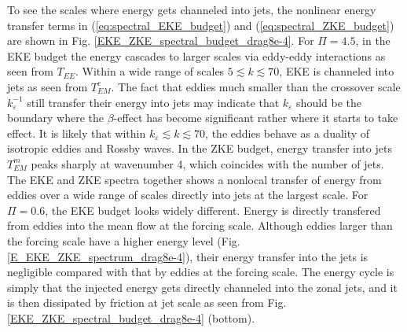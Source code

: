 \documentclass{ametsoc}
\begin{document}
To see the scales where energy gets channeled into jets, the nonlinear 
energy transfer terms in (\ref{eq:spectral_EKE_budget}) and 
(\ref{eq:spectral_ZKE_budget}) are shown in Fig. \ref{EKE_ZKE_spectral_budget_drag8e-4}.
For $\Pi=4.5$, in the EKE budget the energy cascades to larger scales
via eddy-eddy interactions as seen from $T_{EE}$. Within a wide range 
of scales $5\apprle k\apprle70$, EKE is channeled into jets as seen
from $T^e_{EM}$. The fact that eddies much smaller
than the crossover scale $k_{\varepsilon}^{-1}$ still transfer their
energy into jets may indicate that $k_{\varepsilon}$ should
be the boundary where the $\beta$-effect has become significant rather where it
starts to take effect. It is likely that within $k_{\varepsilon}\apprle k\apprle70$,
the eddies behave as a duality of isotropic eddies and Rossby waves.
In the ZKE budget, energy transfer into jets $T_{EM}^{m}$ peaks
sharply at wavenumber 4, which coincides with the number of jets. The
EKE and ZKE spectra together shows a nonlocal transfer of energy from
eddies over a wide range of scales directly into jets at the largest scale.
For $\Pi=0.6$, the EKE budget looks widely different. Energy is directly
transfered from eddies into the mean flow at the forcing scale. Although
eddies larger than the forcing scale have a higher energy level (Fig.
\ref{E_EKE_ZKE_spectrum_drag8e-4}), their energy transfer into the
jets is negligible compared with that by eddies at the forcing scale.
The energy cycle is simply that the injected energy gets directly 
channeled into the zonal jets, and it is then dissipated by friction
at jet scale as seen from Fig. \ref{EKE_ZKE_spectral_budget_drag8e-4} (bottom). 
\end{document}
